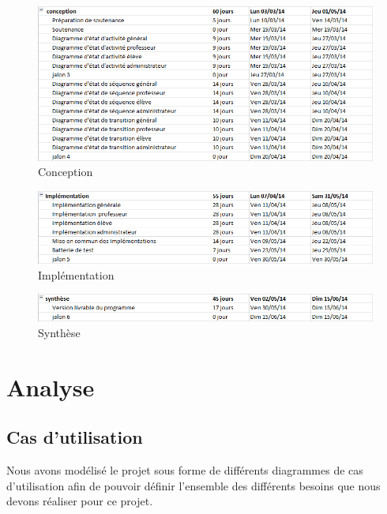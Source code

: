 \documentclass[10pt,a4paper,titlepage]{report}
\begin{document}
	\begin{figure}[h!]
\caption{Conception}
\centering
\includegraphics[scale=0.6]{Include/Conception.png}
\end{figure}
	\begin{figure}[h!]
\caption{Implémentation}
\centering
\includegraphics[scale=0.6]{Include/Implementation.png}
\end{figure}
	\begin{figure}[h!]
\caption{Synthèse}
\centering
\includegraphics[scale=0.6]{Include/Synthese.png}
\end{figure}
\newpage
\chapter{Analyse}
\section{Cas d'utilisation}
	Nous avons modélisé le projet sous forme de différents diagrammes de cas d'utilisation afin de pouvoir définir l'ensemble des différents besoins que nous devons réaliser pour ce projet.
\end{document}
